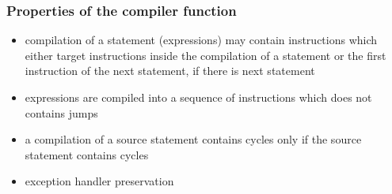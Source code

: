 \documentclass{beamer}
\begin{document}
\begin{frame}\frametitle{Properties of the compiler function}
  \begin{itemize}
     
     \item compilation of a statement (expressions) may contain instructions which either target instructions inside the compilation of a statement or  the 
           first instruction of the next statement, if there is next statement 
     
     \item expressions are compiled into a sequence of instructions which does not contains jumps 
     

     \item a compilation of a source statement contains cycles only if the source statement contains cycles 
     
     \item exception handler preservation 
     
  \end{itemize}
\end{frame}
\end{document}

